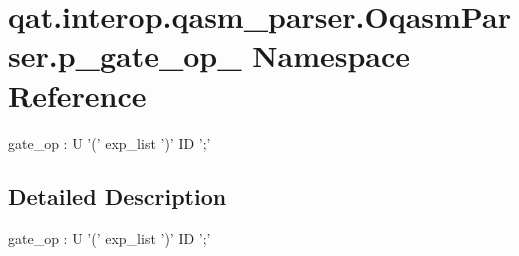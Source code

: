 \hypertarget{namespaceqat_1_1interop_1_1qasm__parser_1_1OqasmParser_1_1p__gate__op__0}{\section{qat.\-interop.\-qasm\-\_\-parser.\-Oqasm\-Parser.\-p\-\_\-gate\-\_\-op\-\_ Namespace Reference}
\label{namespaceqat_1_1interop_1_1qasm__parser_1_1OqasmParser_1_1p__gate__op__0}
}


gate\-\_\-op \-: U '(' exp\-\_\-list ')' I\-D ';'  




\subsection{Detailed Description}
gate\-\_\-op \-: U '(' exp\-\_\-list ')' I\-D ';' 